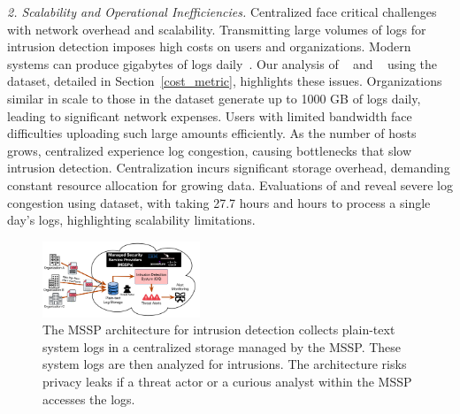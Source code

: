     
\smallskip
\noindent
\textit{2. Scalability and Operational Inefficiencies.}  Centralized \pids face critical challenges with network overhead and scalability. Transmitting large volumes of logs for intrusion detection imposes high costs on users and organizations. Modern systems can produce gigabytes of logs daily~\cite{inam2023sok,hossain+depend}. Our analysis of \flash~\cite{flash2024} and \kairos~\cite{cheng2023kairos} using the \optc dataset, detailed in Section~\ref{cost_metric}, highlights these issues. Organizations similar in scale to those in the \optc dataset generate up to 1000 GB of logs daily, leading to significant network expenses. Users with limited bandwidth face difficulties uploading such large amounts efficiently. As the number of hosts grows, centralized \pids experience log congestion, causing bottlenecks that slow intrusion detection. Centralization incurs significant storage overhead, demanding constant resource allocation for growing data. Evaluations of \flash and \kairos reveal severe log congestion using \optc dataset, with \flash taking 27.7 hours and  hours to process a single day's logs, highlighting scalability limitations.


\begin{figure}[t!]
  \centering
  \includegraphics[width=0.42\textwidth]{fig/mssp.pdf}
  \caption{The MSSP architecture for intrusion detection collects plain-text system logs in a centralized storage managed by the MSSP. These system logs are then analyzed for intrusions. The architecture risks privacy leaks if a threat actor or a curious analyst within the MSSP accesses the logs.}
  \label{mssp}
  \vspace{-4ex}
\end{figure}

\smallskip
{}
\smallskip

